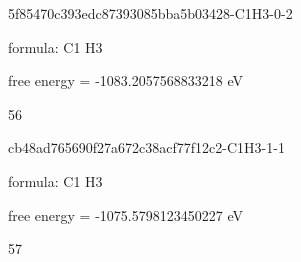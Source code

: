 \documentclass{article}
\begin{document}
\vspace{1cm}


5f85470c393edc87393085bba5b03428-C1H3-0-2



formula: C1 H3



free energy = -1083.2057568833218 eV

56

\vspace{1cm}


cb48ad765690f27a672c38acf77f12c2-C1H3-1-1



formula: C1 H3



free energy = -1075.5798123450227 eV

57
\end{document}
